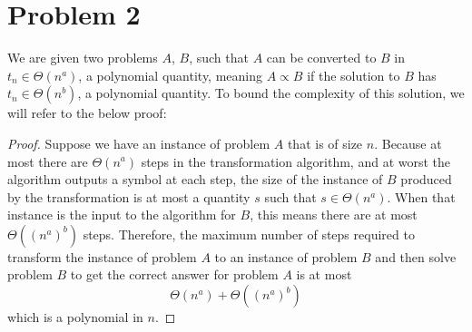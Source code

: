 \section*{Problem 2}

We are given two problems $A$, $B$, such that $A$ can be converted to $B$ in 
$t_n \in \Theta(n^a)$, a polynomial quantity, meaning $A \propto B$ if the solution to $B$ has 
$t_n \in \Theta(n^b)$, a polynomial quantity. To bound the complexity of this 
solution, we will refer to the below proof:

\begin{proof}
Suppose we have an instance of problem $A$ that is of size $n$. Because at 
most there are $\Theta(n^a)$ steps in the transformation algorithm, and at 
worst the algorithm outputs a symbol at each step, the size of the instance 
of $B$ produced by the transformation is at most a quantity $s$ such that 
$s \in \Theta(n^a)$. When that instance is the input to the algorithm for $B$, 
this means there are at most $\Theta\left((n^a)^b\right)$ steps. Therefore, 
the maximum number of steps required to transform the instance of problem $A$ 
to an instance of problem $B$ and then solve problem $B$ to get the correct 
answer for problem $A$ is at most
$$
\Theta(n^a) + \Theta\left((n^a)^b\right)
$$
which is a polynomial in $n$.
\end{proof}
